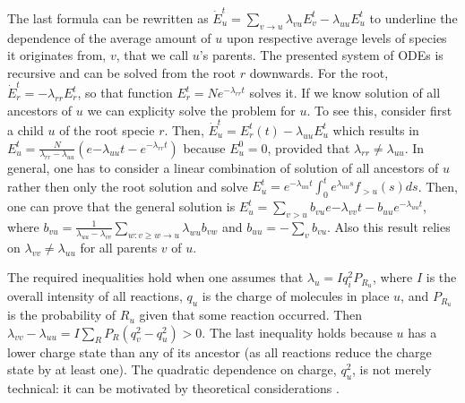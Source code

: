 \documentclass{llncs}
\begin{document}
The last formula can be rewritten as $ \dot E_u^t = \sum_{v\rightarrow u} \lambda_{vu} E_v^t - \lambda_{uu}E_u^t$ to underline the dependence of the average amount of $u$ upon respective average levels of species it originates from, $v$, that we call $u$'s parents.
The presented system of ODEs is recursive and can be solved from the root $r$ downwards.
For the root, $\dot E_r^t=-\lambda_{rr} E_r^t$, so that function $E_r^t= Ne^{-\lambda_{rr}t}$ solves it.
If we know solution of all ancestors of $u$ we can explicity solve the problem for $u$. To see this, consider first a child $u$ of the root specie $r$.
Then, $\dot E_u^t= E_r^t(t)-\lambda_{uu} E_u^t$ which results in $E_u^t= \frac{N}{\lambda_{rr}-\lambda_{uu}}(e{-\lambda_{uu}t}-e^{-\lambda_{rr}t})$ because
$E_u^0=0$, provided that $\lambda_{rr} \not= \lambda_{uu}$. In general, one has to consider a linear combination of solution of all ancestors of $u$ rather then only the root solution and solve $E_u^t=e^{-\lambda_{uu}t} \int_0^t e^{\lambda_{uu}s} f_{>u}(s)ds$.
Then, one can prove that the general solution is $E_u^t=\sum_{v>u}b_{vu}e{-\lambda_{vv}t}-b_{uu}e^{-\lambda_{uu}t}$, where $b_{vu}= \frac{1}{\lambda_{uu}-\lambda_{vv}} \sum_{w: v\geq w \rightarrow u} \lambda_{wu}b_{vw}$ and $b_{uu}=-\sum_v b_{vu}$.
Also this result relies on $\lambda_{vv} \not= \lambda_{uu}$ for all parents $v$ of $u$.
%

The required inequalities hold when one assumes that $\lambda_u = I q_i^2 P_{R_u}$, where $I$ is the overall intensity of all reactions, $q_u$ is the charge of molecules in place $u$, and $P_{R_u}$ is the probability of $R_u$ given that some reaction occurred. Then $\lambda_{vv} - \lambda_{uu} = I \sum_{R} P_R (q_v^2  - q_u^2) > 0.$
The last inequality holds because $u$ has a lower charge state than any of its ancestor
(as all reactions reduce the charge state by at least one).
The quadratic dependence on charge, $q_u^2$, is not merely technical: it can be motivated by theoretical considerations \cite{McLuckey1999-su}.
\end{document}
